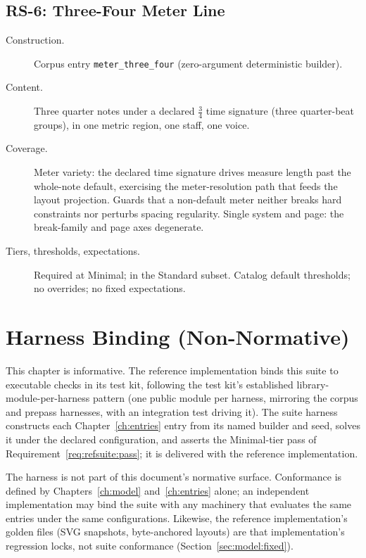 \documentclass[11pt,letterpaper]{report}
\begin{document}
\section{RS-6: Three-Four Meter Line}
\label{sec:entries:rs6}

\begin{description}
  \item[Construction.] Corpus entry \texttt{meter\_three\_four}
    (zero-argument deterministic builder).
  \item[Content.] Three quarter notes under a declared
    $\tfrac{3}{4}$ time signature (three quarter-beat groups), in one
    metric region, one staff, one voice.
  \item[Coverage.] Meter variety: the declared time signature drives
    measure length past the whole-note default, exercising the
    meter-resolution path that feeds the layout projection. Guards that
    a non-default meter neither breaks hard constraints nor perturbs
    spacing regularity. Single system and page: the break-family and
    page axes degenerate.
  \item[Tiers, thresholds, expectations.] Required at Minimal; in the
    Standard subset. Catalog default thresholds; no overrides; no fixed
    expectations.
\end{description}

\chapter{Harness Binding (Non-Normative)}
\label{ch:harness}

This chapter is informative. The reference implementation binds this
suite to executable checks in its test kit, following the test kit's
established library-module-per-harness pattern (one public module per
harness, mirroring the corpus and prepass harnesses, with an integration
test driving it). The suite harness constructs each Chapter~\ref{ch:entries}
entry from its named builder and seed, solves it under the declared
configuration, and asserts the Minimal-tier pass of
Requirement~\ref{req:refsuite:pass}; it is delivered with the reference
implementation.

\begin{nongoal}
The harness is not part of this document's normative surface. Conformance
is defined by Chapters~\ref{ch:model} and~\ref{ch:entries} alone; an
independent implementation may bind the suite with any machinery that
evaluates the same entries under the same configurations. Likewise, the
reference implementation's golden files (SVG snapshots, byte-anchored
layouts) are that implementation's regression locks, not suite
conformance (Section~\ref{sec:model:fixed}).
\end{nongoal}
\end{document}
